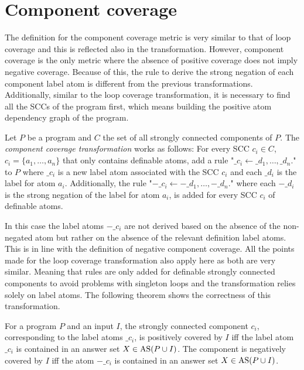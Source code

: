 \section{Component coverage}
\label{sec:Computing coverage metrics for propositional programs/Component coverage}
The definition for the component coverage metric is very similar to that of loop coverage and this is reflected also in the transformation. However, component coverage is the only metric where the absence of positive coverage does not imply negative coverage. Because of this, the rule to derive the strong negation of each component label atom is different from the previous transformations. Additionally, similar to the loop coverage transformation, it is necessary to find all the SCCs of the program first, which means building the positive atom dependency graph of the program.

\begin{definition}
\label{def:component transformation}
    Let $P$ be a program and $C$ the set of all strongly connected components of $P$. The \emph{component coverage transformation} works as follows: For every SCC \(c_i \in C\), \(c_i = \{a_1, \ldots, a_n\}\) that only contains definable atoms, add a rule "\(\_c_i \leftarrow \_d_1, \ldots, \_d_n.\)" to $P$ where $\_c_i$ is a new label atom associated with the SCC $c_i$ and each $\_d_i$ is the label for atom $a_i$. Additionally, the rule "\(-\_c_i \leftarrow -\_d_1, \ldots, -\_d_n.\)" where each $-\_d_i$ is the strong negation of the label for atom $a_i$, is added for every SCC $c_i$ of definable atoms.
\end{definition}

In this case the label atoms $-\_c_i$ are not derived based on the absence of the non-negated atom but rather on the absence of the relevant definition label atoms. This is in line with the definition of negative component coverage. All the points made for the loop coverage transformation also apply here as both are very similar. Meaning that rules are only added for definable strongly connected components to avoid problems with singleton loops and the transformation relies solely on label atoms. The following theorem shows the correctness of this transformation. 

\begin{theorem}
\label{th:component transformation}
    For a program $P$ and an input $I$, the strongly connected component $c_i$, corresponding to the label atoms $\_c_i$, is positively covered by $I$ iff the label atom $\_c_i$ is contained in an answer set \(X \in \operatorname{AS}(P \cup I)\). The component is negatively covered by $I$ iff the atom $-\_c_i$ is contained in an answer set \(X \in \operatorname{AS}(P \cup I)\).
\end{theorem}

